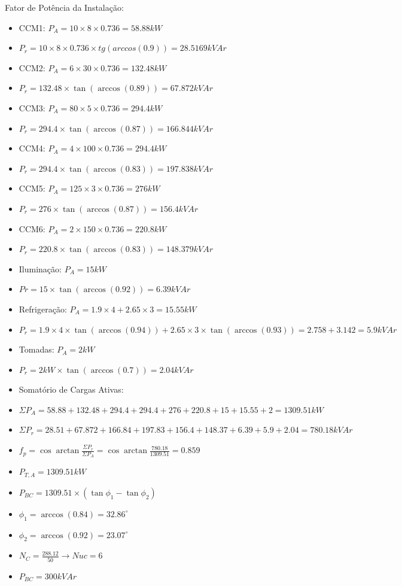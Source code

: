 Fator de Potência da Instalação:
\begin{itemize}
\item CCM1: $P_A = 10 \times 8 \times 0.736 = 58.88kW$
\item       $P_r = 10 \times 8 \times 0.736 \times tg(arccos(0.9)) = 28.5169kVAr$
\item CCM2: $P_A = 6  \times 30\times 0.736 = 132.48kW$
\item       $P_r = 132.48\times \tan(\arccos(0.89)) = 67.872kVAr$
\item CCM3: $P_A = 80 \times 5 \times 0.736 = 294.4kW$
\item       $P_r = 294.4 \times \tan(\arccos(0.87)) = 166.844kVAr$
\item CCM4: $P_A = 4 \times 100 \times 0.736 = 294.4kW$
\item       $P_r = 294.4\times \tan(\arccos(0.83)) = 197.838kVAr$
\item CCM5: $P_A = 125 \times 3 \times 0.736 = 276kW$
\item       $P_r = 276\times \tan(\arccos(0.87))= 156.4kVAr$
\item CCM6: $P_A = 2 \times 150 \times 0.736 = 220.8kW$
\item       $P_r = 220.8\times \tan(\arccos(0.83)) = 148.379kVAr$
\item Iluminação: $P_A = 15kW$
\item             $Pr = 15\times \tan(\arccos(0.92)) = 6.39 kVAr$
\item Refrigeração: $P_A = 1.9\times4 + 2.65\times3 = 15.55kW$
\item     $P_r = 1.9\times4\times \tan(\arccos(0.94)) + 2.65\times3\times \tan(\arccos(0.93)) = 2.758+ 3.142 = 5.9kVAr$
\item Tomadas:  $P_A = 2kW$
\item     $P_r = 2kW\times \tan(\arccos(0.7)) = 2.04kVAr$
\item Somatório de Cargas Ativas:
\item $\Sigma P_A = 58.88+132.48+294.4+294.4+276+220.8+15+15.55+2= 1309.51 kW$
\item $\Sigma P_r = 28.51+67.872+166.84+197.83+156.4+148.37+6.39+5.9+2.04 = 780.18kVAr$
\item $f_p = \cos \arctan\frac{\Sigma P_r}{\Sigma P_A} = \cos \arctan\frac{780.18}{1309.51} = 0.859$
\item $P_{T,A}= 1309.51kW$
\item $P_{BC} = 1309.51\times(\tan\phi_1-\tan\phi_2)$
\item $ \phi_1 = \arccos(0.84) = {32.86}^\circ$
\item $ \phi_2 = \arccos(0.92) = {23.07}^\circ$
\item $N_{C} = \frac{288.12}{50} \longrightarrow Nuc = 6$
\item $P_{BC} = 300kVAr$

\end{itemize}



